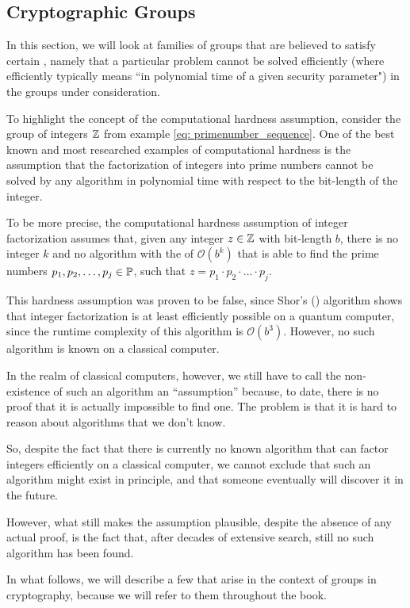 \subsection{Cryptographic Groups}
\label{crypto_groups} In this section, we will look at families of groups that are believed to satisfy certain , namely that a particular problem cannot be solved efficiently (where efficiently typically means ``in polynomial time of a given security parameter") in the groups under consideration.
\begin{example}
To highlight the concept of the computational hardness assumption, consider the group of integers $\mathbb{Z}$ from example \ref{eq: primenumber_sequence}. One of the best known and most researched examples of computational hardness is the assumption that the factorization of integers into prime numbers cannot be solved by any algorithm in polynomial time with respect to the bit-length of the integer.

To be more precise, the computational hardness assumption of integer factorization assumes that, given any integer $z\in\mathbb{Z}$ with bit-length $b$, there is no integer $k$ and no algorithm with the  of $\mathcal{O}(b^k)$ that is able to find the prime numbers $p_1, p_2,\ldots,p_j\in\mathbb{P}$, such that $z=p_1\cdot p_2\cdot \ldots\cdot p_j$.

This hardness assumption was proven to be false, since Shor's (\citeyear{shor94}) algorithm shows that integer factorization is at least efficiently possible on a quantum computer, since the runtime complexity of this algorithm is $\mathcal{O}(b^3)$. However, no such algorithm is known on a classical computer.

In the realm of classical computers, however, we still have to call the non-existence of such an algorithm an ``assumption'' because, to date, there is no proof that it is actually impossible to find one. The problem is that it is hard to reason about algorithms that we don't know.

So, despite the fact that there is currently no known algorithm that can factor integers efficiently on a classical computer, we cannot exclude that such an algorithm might exist in principle, and that someone eventually will discover it in the future.

However, what still makes the assumption plausible, despite the absence of any actual proof, is the fact that, after decades of extensive search, still no such algorithm has been found.
\end{example}
In what follows, we will describe a few  that arise in the context of groups in cryptography, because we will refer to them throughout the book.
